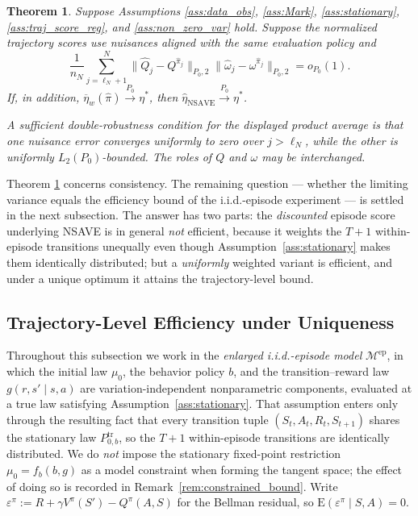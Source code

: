 \documentclass[12pt]{article}
\newtheorem{theorem}{Theorem}[section]
\theoremstyle{remark}\newtheorem{remark}[theorem]{Remark}\theoremstyle{plain}
\newcommand{\E}{\mathrm{E}}
\begin{document}
\begin{theorem}\label{thm:DR_under_policy_alignment}
    Suppose Assumptions \ref{ass:data_obs}, \ref{ass:Mark},
    \ref{ass:stationary}, \ref{ass:traj_score_reg}, and
    \ref{ass:non_zero_var} hold.  Suppose the normalized trajectory
    scores use nuisances aligned with the same evaluation policy and
    \[
        \frac1{n_N}\sum_{j=\ell_N+1}^N
        \|\widehat Q_j-Q^{\widehat\pi_j}\|_{P_0,2}
        \|\widehat\omega_j-\omega^{\widehat\pi_j}\|_{P_0,2}
        =o_{P_0}(1).
    \]
    If, in addition,
    $\overline\eta_w(\widehat\pi)\overset{P_0}{\to}\eta^*$, then
    $\widehat\eta_{\mathrm{NSAVE}}\overset{P_0}{\to}\eta^*$.

    A sufficient double-robustness condition for the displayed
    product average is that one nuisance error converges uniformly to
    zero over $j>\ell_N$, while the other is uniformly
    $L_2(P_0)$-bounded.  The roles of $Q$ and $\omega$ may be
    interchanged.
\end{theorem}

Theorem \ref{thm:DR_under_policy_alignment} concerns consistency.  The
remaining question --- whether the limiting variance equals the
efficiency bound of the i.i.d.-episode experiment --- is settled in the
next subsection.  The answer has two parts: the \emph{discounted}
episode score underlying NSAVE is in general \emph{not} efficient,
because it weights the $T+1$ within-episode transitions unequally even
though Assumption~\ref{ass:stationary} makes them identically
distributed; but a \emph{uniformly} weighted variant is efficient, and
under a unique optimum it attains the trajectory-level bound.%


\subsection{Trajectory-Level Efficiency under Uniqueness}
\label{sec:traj_eff}



Throughout this subsection we work in the \emph{enlarged i.i.d.-episode
model} $\mathcal M^{\mathrm{ep}}$, in which the initial law $\mu_0$, the
behavior policy $b$, and the transition--reward law $g(r,s'\mid s,a)$
are variation-independent nonparametric components, evaluated at a true
law satisfying Assumption~\ref{ass:stationary}.  That assumption enters
only through the resulting fact that every transition tuple
$(S_t,A_t,R_t,S_{t+1})$ shares the stationary law
$P_{0,b}^{\mathrm{tr}}$, so the $T+1$ within-episode transitions are
identically distributed.  We do \emph{not} impose the stationary
fixed-point restriction $\mu_0=f_b(b,g)$ as a model constraint when
forming the tangent space; the effect of doing so is recorded in
Remark~\ref{rem:constrained_bound}.  Write
$\varepsilon^\pi:=R+\gamma V^\pi(S')-Q^\pi(A,S)$ for the Bellman
residual, so $\E(\varepsilon^\pi\mid S,A)=0$.
\end{document}

